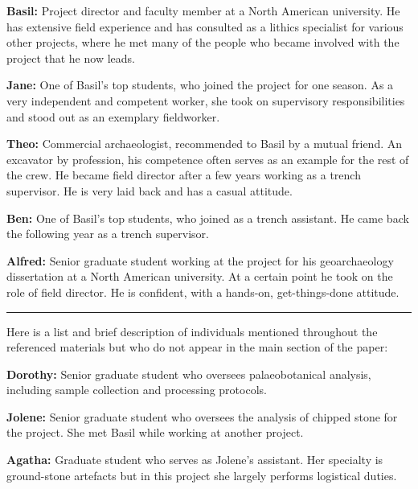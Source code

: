 \documentclass{article}
\begin{document}
\noindent\textbf{Basil:} Project director and faculty member at a North American
university. He has extensive field experience and has consulted as a
lithics specialist for various other projects, where he met many of the
people who became involved with the project that he now leads.\newline

\noindent\textbf{Jane:} One of Basil's top students, who joined the project for
one season. As a very independent and competent worker, she took on
supervisory responsibilities and stood out as an exemplary fieldworker.\newline

\noindent\textbf{Theo:} Commercial archaeologist, recommended to Basil by a
mutual friend. An excavator by profession, his competence often serves
as an example for the rest of the crew. He became field director after a
few years working as a trench supervisor. He is very laid back and has a
casual attitude.\newline

\noindent\textbf{Ben:} One of Basil's top students, who joined as a trench
assistant. He came back the following year as a trench supervisor.\newline

\noindent\textbf{Alfred:} Senior graduate student working at the project for his
geoarchaeology dissertation at a North American university. At a certain
point he took on the role of field director. He is confident, with a
hands-on, get-things-done attitude.\newline

\noindent\begin{center}\rule{0.5\linewidth}{0.5pt}\end{center}

\noindent Here is a list and brief description of individuals mentioned throughout the referenced materials but who do not appear in the main section of the paper:\newline

\noindent\textbf{Dorothy:} Senior graduate student who oversees palaeobotanical
analysis, including sample collection and processing protocols.\newline

\noindent\textbf{Jolene:} Senior graduate student who oversees the analysis of
chipped stone for the project. She met Basil while working at another
project.\newline

\noindent\textbf{Agatha:} Graduate student who serves as Jolene's assistant. Her
specialty is ground-stone artefacts but in this project she largely
performs logistical duties.\newline
\end{document}
